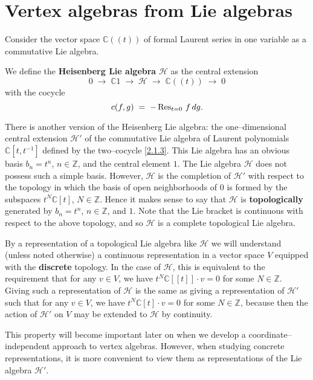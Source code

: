 \documentclass[12pt]{article}
\begin{document}
\section{Vertex algebras from Lie algebras}
Consider the vector space $\mathbb{C}((t))$ of formal Laurent series in one variable as a commutative Lie algebra.

\begin{definition}
    We define the \textbf{Heisenberg Lie algebra} $\mathcal{H}$ as the central extension
    \begin{equation} \label{2.1.2}
        0 \;\longrightarrow\; \mathbb{C}1 \;\longrightarrow\; \mathcal{H} \;\longrightarrow\; \mathbb{C}((t)) \;\longrightarrow\; 0
    \end{equation}
    with the cocycle
    \begin{equation} \label{2.1.3}
        c(f,g) \;=\; -\operatorname{Res}_{t=0}\, f\,dg.
    \end{equation}

    There is another version of the Heisenberg Lie algebra: the one–dimensional central extension $\mathcal{H}'$ of the commutative Lie algebra of Laurent polynomials $\mathbb{C}[t,t^{-1}]$ defined by the two–cocycle \eqref{2.1.3}.
    This Lie algebra has an obvious basis $b_n = t^n$, $n \in \mathbb{Z}$, and the central element $1$. The Lie algebra $\mathcal{H}$ does not possess such a simple basis.
    However, $\mathcal{H}$ is the completion of $\mathcal{H}'$ with respect to the topology in which the basis of open neighborhoods of $0$ is formed by the subspaces $t^N\mathbb{C}[t]$, $N\in\mathbb{Z}$.
    Hence it makes sense to say that $\mathcal{H}$ is \textbf{topologically} generated by $b_n = t^n$, $n\in\mathbb{Z}$, and $1$.
    Note that the Lie bracket is continuous with respect to the above topology, and so $\mathcal{H}$ is a complete topological Lie algebra.

    By a representation of a topological Lie algebra like $\mathcal{H}$ we will understand (unless noted otherwise) a continuous representation in a vector space $V$ equipped with the \textbf{discrete} topology.
    In the case of $\mathcal{H}$, this is equivalent to the requirement that for any $v\in V$, we have $t^N\mathbb{C}[[t]]\cdot v = 0$ for some $N\in\mathbb{Z}$.
    Giving such a representation of $\mathcal{H}$ is the same as giving a representation of $\mathcal{H}'$ such that for any $v\in V$, we have $t^N\mathbb{C}[t]\cdot v = 0$ for some $N\in\mathbb{Z}$, because then the action of $\mathcal{H}'$ on $V$ may be extended to $\mathcal{H}$ by continuity.

    This property will become important later on when we develop a coordinate–independent approach to vertex algebras. However, when studying concrete representations, it is more convenient to view them as representations of the Lie algebra $\mathcal{H}'$.
\end{definition}
\end{document}
